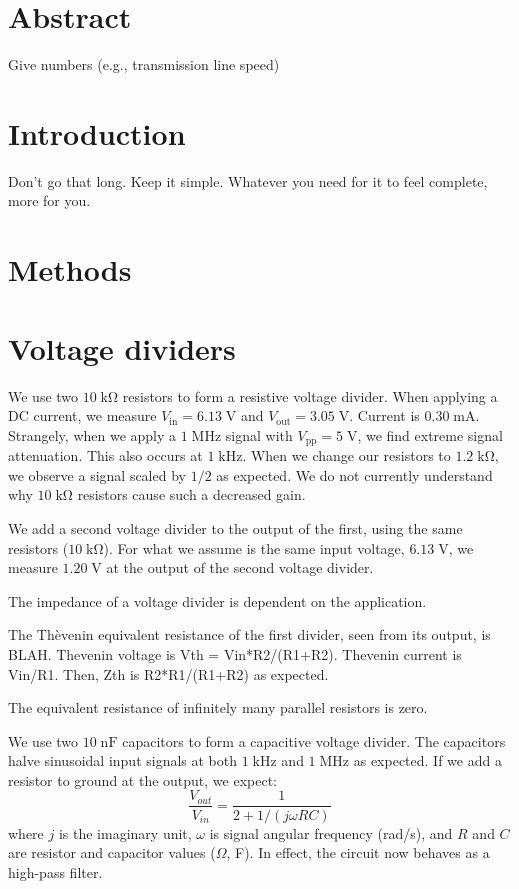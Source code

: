 \documentclass[11pt]{article}
\newcommand {\mt}{\mathrm}
\newcommand {\unit}[1]{\; \mt{#1}}
\begin{document}
\section{Abstract}

Give numbers (e.g., transmission line speed)

\section{Introduction}

Don't go that long.  Keep it simple.  Whatever you need for it to feel
complete, more for you.

\section{Methods}

\section{Voltage dividers}

We use two $10 \unit{k\Omega}$ resistors to form a resistive voltage divider.
When applying a DC current, we measure $V_\mt{in} = 6.13 \unit{V}$
and $V_\mt{out} = 3.05 \unit{V}$.  Current is $0.30 \unit{mA}$.
Strangely, when we apply a $1 \unit{MHz}$ signal with $V_\mt{pp} = 5 \unit{V}$,
we find extreme signal attenuation.  This also occurs at $1 \unit{kHz}$.
When we change our resistors to $1.2 \unit{k\Omega}$, we observe
a signal scaled by $1/2$ as expected.  We do not currently understand why
$10 \unit{k\Omega}$ resistors cause such a decreased gain.

We add a second voltage divider to the output of the first, using the
same resistors ($10 \unit{k\Omega}$).  For what we assume is the same
input voltage, $6.13 \unit{V}$, we measure $1.20 \unit{V}$ at the output
of the second voltage divider.

The impedance of a voltage divider is dependent on the application.

The Th\`{e}venin equivalent resistance of the first divider, seen from
its output, is BLAH.  Thevenin voltage is Vth = Vin*R2/(R1+R2).  Thevenin
current is Vin/R1.  Then, Zth is R2*R1/(R1+R2) as expected.

The equivalent resistance of infinitely many parallel resistors is zero.

We use two $10 \unit{nF}$ capacitors to form a capacitive voltage divider.
The capacitors halve sinusoidal input signals at both $1 \unit{kHz}$ and
$1 \unit{MHz}$ as expected.  If we add a resistor to ground at the output,
we expect:
\begin{equation}
  \frac{V_{out}}{V_{in}} = \frac{1}{2 + 1/(j\omega RC)}
\end{equation}
where $j$ is the imaginary unit, $\omega$ is signal angular frequency (rad/s),
and $R$ and $C$ are resistor and capacitor values ($\Omega$, F).  In effect,
the circuit now behaves as a high-pass filter.
\end{document}
